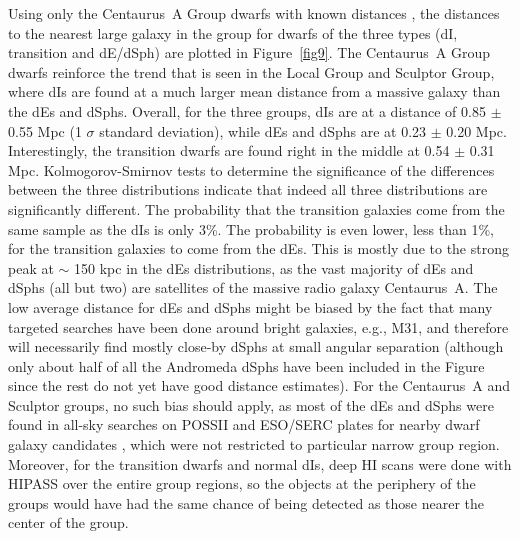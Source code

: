 \documentclass[preprint]{aastex}
\begin{document}
Using only the Centaurus~A Group dwarfs with known distances 
\citep[see][]{k07}, the distances to the nearest large galaxy in the 
group for dwarfs of the three types (dI, transition and dE/dSph) are plotted
in Figure~\ref{fig9}. The Centaurus~A Group dwarfs reinforce the trend that 
is seen in the Local Group and Sculptor Group, where dIs are found at a much
larger mean distance from a massive galaxy than the dEs and dSphs. 
Overall, for the three groups, dIs are at a distance of 0.85 $\pm$ 
0.55 Mpc (1 $\sigma$ standard deviation), while dEs and dSphs are at 
0.23 $\pm$ 0.20 Mpc. Interestingly,
the transition dwarfs are found right in the middle at 0.54  $\pm$ 0.31 Mpc.
Kolmogorov-Smirnov tests to determine the significance of the differences    
between the three distributions indicate that indeed all three distributions
are significantly different. The probability that the transition galaxies 
come from the same sample as the dIs is only 3\%. The probability
is even lower, less than 1\%, for the transition galaxies to come from the dEs. 
This is mostly due to the strong peak at $\sim $ 150 kpc in the dEs distributions,
as the vast majority of dEs and dSphs (all but two) 
are satellites of the massive radio galaxy Centaurus~A. The low average distance 
for dEs and dSphs might be biased by the fact that many targeted searches have been
done around bright galaxies, e.g., M31, and therefore will necessarily find 
mostly close-by
dSphs at small angular separation (although only about half of all the Andromeda
dSphs have been included in the Figure since the rest do not yet have good
distance estimates). For the Centaurus~A and Sculptor groups, no such bias 
should apply, as most of the dEs and dSphs were found in all-sky searches 
on POSSII and ESO/SERC plates for nearby dwarf galaxy candidates 
\citep[e.g.,][]{kk98, kk00}, which were not restricted to particular narrow
group region. Moreover, for the transition dwarfs and normal dIs, deep HI scans
were done with HIPASS \citep{b99} over the entire group regions, so the objects
at the periphery of the groups would have had the same chance of being detected
as those nearer the center of the group.
\end{document}
